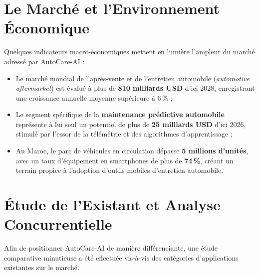 \documentclass[12pt,a4paper,oneside]{report}
\newcommand{\bpuce}{\textcolor{midBlue}{$\blacktriangleright$}\;}
\begin{document}
\section{Le March\'e et l'Environnement \'Economique}
Quelques indicateurs macro-\'economiques mettent en lumi\`ere l'ampleur du march\'e adress\'e par AutoCare-AI :
\begin{itemize}[label=\bpuce]
  \item Le march\'e mondial de l'apr\`es-vente et de l'entretien automobile (\textit{automotive aftermarket}) est \'evalu\'e \`a plus de \textbf{810 milliards USD} d'ici 2028, enregistrant une croissance annuelle moyenne sup\'erieure \`a 6\,\% ;
  \item Le segment sp\'ecifique de la \textbf{maintenance pr\'edictive automobile} repr\'esente \`a lui seul un potentiel de plus de \textbf{25 milliards USD} d'ici 2026, stimul\'e par l'essor de la t\'el\'em\'etrie et des algorithmes d'apprentissage ;
  \item Au Maroc, le parc de v\'ehicules en circulation d\'epasse \textbf{5 millions d'unit\'es}, avec un taux d'\'equipement en smartphones de plus de \textbf{74\,\%}, cr\'eant un terrain propice \`a l'adoption d'outils mobiles d'entretien automobile.
\end{itemize}

\section{\'Etude de l'Existant et Analyse Concurrentielle}
Afin de positionner AutoCare-AI de mani\`ere diff\'erenciante, une \'etude comparative minutieuse a \'et\'e effectu\'ee vis-\`a-vis des cat\'egories d'applications existantes sur le march\'e.
\end{document}
